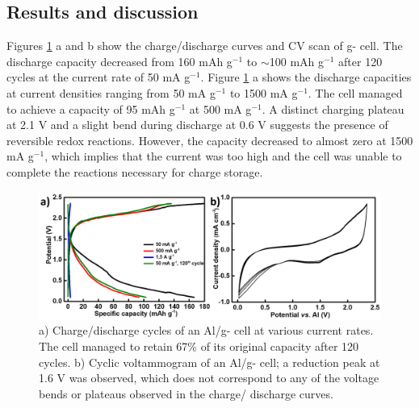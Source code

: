 \subsection{Results and discussion}
Figures \ref{Figures/chap6fig:CNUcdccv} a and b show the charge/discharge curves and CV scan of g- cell. The discharge capacity decreased from 160 mAh g$^{-1}$ to $\sim$100 mAh g$^{-1}$ after 120 cycles at the current rate of 50 mA g$^{-1}$. Figure \ref{Figures/chap6fig:CNUcdccv} a shows the discharge capacities at current densities ranging from 50 mA g$^{-1}$ to 1500 mA g$^{-1}$. The cell managed to achieve a capacity of 95 mAh g$^{-1}$ at 500 mA g$^{-1}$. A distinct charging plateau at 2.1 V and a slight bend during discharge at 0.6 V suggests the presence of reversible redox reactions. However, the capacity decreased to almost zero at 1500 mA g$^{-1}$, which implies that the current was too high and the cell was unable to complete the reactions necessary for charge storage. 

\begin{figure}[th!]
\centering
\includegraphics[width=\textwidth]{Figures/chap6fig/CNUcdccv}
\caption{a) Charge/discharge cycles of an Al/g- cell at various current rates. The cell managed to retain 67\% of its original capacity after 120 cycles. b) Cyclic voltammogram of an Al/g- cell; a reduction peak at 1.6 V was observed, which does not correspond to any of the voltage bends or plateaus observed in the charge/ discharge curves. }
\label{Figures/chap6fig:CNUcdccv}
\end{figure}

